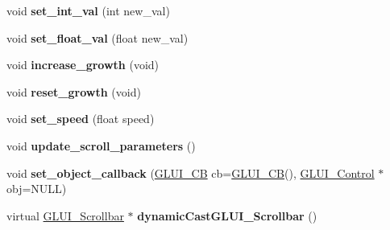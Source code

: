 \begin{DoxyCompactItemize}
\item 
\hypertarget{class_g_l_u_i___scrollbar_a2d263e3dde48426abf2ae9952800da24}{void {\bfseries set\+\_\+int\+\_\+val} (int new\+\_\+val)}\label{class_g_l_u_i___scrollbar_a2d263e3dde48426abf2ae9952800da24}

\item 
\hypertarget{class_g_l_u_i___scrollbar_a9218eae03ae93e87d27ac44fdeac212b}{void {\bfseries set\+\_\+float\+\_\+val} (float new\+\_\+val)}\label{class_g_l_u_i___scrollbar_a9218eae03ae93e87d27ac44fdeac212b}

\item 
\hypertarget{class_g_l_u_i___scrollbar_a2bf1121968251b280e917d657fa0dc28}{void {\bfseries increase\+\_\+growth} (void)}\label{class_g_l_u_i___scrollbar_a2bf1121968251b280e917d657fa0dc28}

\item 
\hypertarget{class_g_l_u_i___scrollbar_a92d94cb2a3a19b5f8e8e5ab62b44cf89}{void {\bfseries reset\+\_\+growth} (void)}\label{class_g_l_u_i___scrollbar_a92d94cb2a3a19b5f8e8e5ab62b44cf89}

\item 
\hypertarget{class_g_l_u_i___scrollbar_aa94898fe6a3cd99b8c65c7b68ba079e0}{void {\bfseries set\+\_\+speed} (float speed)}\label{class_g_l_u_i___scrollbar_aa94898fe6a3cd99b8c65c7b68ba079e0}

\item 
\hypertarget{class_g_l_u_i___scrollbar_acb6c92188a213dd09441807bb3cf103c}{void {\bfseries update\+\_\+scroll\+\_\+parameters} ()}\label{class_g_l_u_i___scrollbar_acb6c92188a213dd09441807bb3cf103c}

\item 
\hypertarget{class_g_l_u_i___scrollbar_a7d26927f9679f449e6b5628a13851efc}{void {\bfseries set\+\_\+object\+\_\+callback} (\hyperlink{class_g_l_u_i___c_b}{G\+L\+U\+I\+\_\+\+C\+B} cb=\hyperlink{class_g_l_u_i___c_b}{G\+L\+U\+I\+\_\+\+C\+B}(), \hyperlink{class_g_l_u_i___control}{G\+L\+U\+I\+\_\+\+Control} $\ast$obj=N\+U\+L\+L)}\label{class_g_l_u_i___scrollbar_a7d26927f9679f449e6b5628a13851efc}

\item 
\hypertarget{class_g_l_u_i___scrollbar_a6bbb2d0641eb7b41a68b897a39649527}{virtual \hyperlink{class_g_l_u_i___scrollbar}{G\+L\+U\+I\+\_\+\+Scrollbar} $\ast$ {\bfseries dynamic\+Cast\+G\+L\+U\+I\+\_\+\+Scrollbar} ()}\label{class_g_l_u_i___scrollbar_a6bbb2d0641eb7b41a68b897a39649527}

\end{DoxyCompactItemize}
